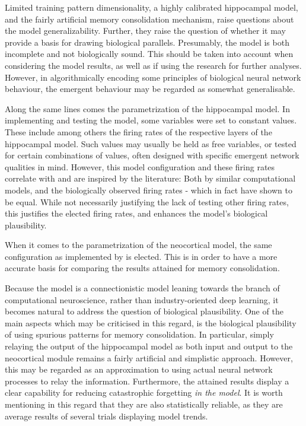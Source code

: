

Limited training pattern dimensionality, a highly calibrated hippocampal model, and the fairly artificial memory consolidation mechanism, raise questions about the model generalizability. Further, they raise the question of whether it may provide a basis for drawing biological parallels.
Presumably, the model is both incomplete and not biologically sound. This should be taken into account when considering the model results, as well as if using the research for further analyses. However, in algorithmically encoding some principles of biological neural network behaviour, the emergent behaviour may be regarded as somewhat generalisable.

Along the same lines comes the parametrization of the hippocampal model. In implementing and testing the model, some variables were set to constant values. These include among others the firing rates of the respective layers of the hippocampal model. Such values may usually be held as free variables, or tested for certain combinations of values, often designed with specific emergent network qualities in mind. However, this model configuration and these firing rates correlate with and are inspired by the literature: Both by similar computational models, and the biologically observed firing rates - which in fact have shown to be equal. While not necessarily justifying the lack of testing other firing rates, this justifies the elected firing rates, and enhances the model's biological plausibility.

When it comes to the parametrization of the neocortical model, the same configuration as implemented by \cite{Hattori2010, Hattori2014} is elected. This is in order to have a more accurate basis for comparing the results attained for memory consolidation.

Because the model is a connectionistic model leaning towards the branch of computational neuroscience, rather than industry-oriented deep learning, it becomes natural to address the question of biological plausibility. One of the main aspects which may be criticised in this regard, is the biological plausibility of using spurious patterns for memory consolidation. In particular, simply relaying the output of the hippocampal model as both input and output to the neocortical module remains a fairly artificial and simplistic approach. However, this may be regarded as an approximation to using actual neural network processes to relay the information. Furthermore, the attained results display a clear capability for reducing catastrophic forgetting \textit{in the model}. It is worth mentioning in this regard that they are also statistically reliable, as they are average results of several trials displaying model trends.

